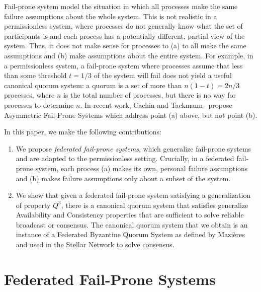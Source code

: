 \documentclass[11pt,letterpaper]{article}
\begin{document}
Fail-prone system model the situation in which all processes make the same failure assumptions about the whole system.
This is not realistic in a permissionless system, where processes do not generally know what the set of participants is and each process has a potentially different, partial view of the system.
Thus, it does not make sense for processes to (a) to all make the same assumptions and (b) make assumptions about the entire system.
For example, in a permissionless system, a fail-prone system where processes assume that less than some threshold $t=1/3$ of the system will fail does not yield a useful canonical quorum system: a quorum is a set of more than $n(1-t)=2n/3$ processes, where $n$ is the total number of processes, but there is no way for processes to determine $n$.
In recent work, Cachin and Tackmann~\cite{cachinAsymmetricDistributedTrust2019} propose Asymmetric Fail-Prone Systems which address point (a) above, but not point (b).

In this paper, we make the following contributions:
\begin{enumerate}
  \item
    We propose \emph{federated fail-prone systems}, which generalize fail-prone systems and are adapted to the permissionless setting.
    Crucially, in a federated fail-prone system, each process (a) makes its own, personal failure assumptions and (b) makes failure assumptions only about a subset of the system.
  \item
    We show that given a federated fail-prone system satisfying a generalization of property $Q^3$, there is a canonical quorum system that satisfies generalize Availability and Consistency properties that are sufficient to solve reliable broadcast or consensus.
    The canonical quorum system that we obtain is an instance of a Federated Byzantine Quorum System as defined by Mazières~\cite{MazieresStellarConsensusProtocol2015} and used in the Stellar Network to solve consensus.
\end{enumerate}


\section{Federated Fail-Prone Systems}
\label{sec:basic}
\end{document}
